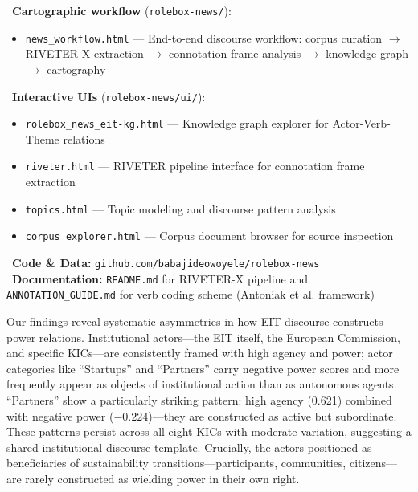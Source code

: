 \documentclass[../main.tex]{subfiles}
\begin{document}
\begin{replicationbox}
\faLaptopCode\ \textbf{Cartographic workflow} (\texttt{rolebox-news/}):
\begin{itemize}[leftmargin=*, itemsep=0.1em]
    \item \texttt{news\_workflow.html} --- End-to-end discourse workflow: corpus curation $\rightarrow$ RIVETER-X extraction $\rightarrow$ connotation frame analysis $\rightarrow$ knowledge graph $\rightarrow$ cartography
\end{itemize}
\faLaptopCode\ \textbf{Interactive UIs} (\texttt{rolebox-news/ui/}):
\begin{itemize}[leftmargin=*, itemsep=0.1em]
    \item \texttt{rolebox\_news\_eit-kg.html} --- Knowledge graph explorer for Actor-Verb-Theme relations
    \item \texttt{riveter.html} --- RIVETER pipeline interface for connotation frame extraction
    \item \texttt{topics.html} --- Topic modeling and discourse pattern analysis
    \item \texttt{corpus\_explorer.html} --- Corpus document browser for source inspection
\end{itemize}
\faGithub\ \textbf{Code \& Data:} \texttt{github.com/babajideowoyele/rolebox-news}\\
\faBook\ \textbf{Documentation:} \texttt{README.md} for RIVETER-X pipeline and \texttt{ANNOTATION\_GUIDE.md} for verb coding scheme (Antoniak et al. framework)
\end{replicationbox}

Our findings reveal systematic asymmetries in how EIT discourse constructs power relations. Institutional actors---the EIT itself, the European Commission, and specific KICs---are consistently framed with high agency and power; actor categories like ``Startups'' and ``Partners'' carry negative power scores and more frequently appear as objects of institutional action than as autonomous agents. ``Partners'' show a particularly striking pattern: high agency (0.621) combined with negative power ($-0.224$)---they are constructed as active but subordinate. These patterns persist across all eight KICs with moderate variation, suggesting a shared institutional discourse template. Crucially, the actors positioned as beneficiaries of sustainability transitions---participants, communities, citizens---are rarely constructed as wielding power in their own right.
\end{document}
